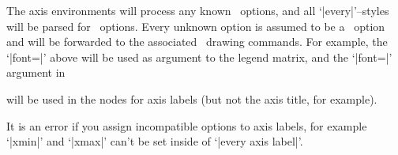 The axis environments will process any known \PGFPlots\ options, and all `|every|'--styles will be parsed for \PGFPlots\ options. Every unknown option is assumed to be a \Tikz\ option and will be forwarded to the associated \Tikz\ drawing commands. For example, the `|font=\Large|' above will be used as argument to the legend matrix, and the `|font=\Large|' argument in
\begin{codeexample}
\end{codeexample}
will be used in the nodes for axis labels (but not the axis title, for example).

It is an error if you assign incompatible options to axis labels, for example `|xmin|' and `|xmax|' can't be set inside of `|every axis label|'.
